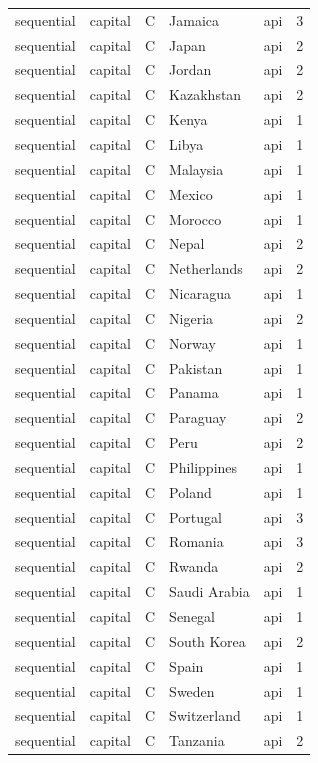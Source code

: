 \begin{tabular}{lllllr}
sequential & capital & C & Jamaica & api & 3 \\
sequential & capital & C & Japan & api & 2 \\
sequential & capital & C & Jordan & api & 2 \\
sequential & capital & C & Kazakhstan & api & 2 \\
sequential & capital & C & Kenya & api & 1 \\
sequential & capital & C & Libya & api & 1 \\
sequential & capital & C & Malaysia & api & 1 \\
sequential & capital & C & Mexico & api & 1 \\
sequential & capital & C & Morocco & api & 1 \\
sequential & capital & C & Nepal & api & 2 \\
sequential & capital & C & Netherlands & api & 2 \\
sequential & capital & C & Nicaragua & api & 1 \\
sequential & capital & C & Nigeria & api & 2 \\
sequential & capital & C & Norway & api & 1 \\
sequential & capital & C & Pakistan & api & 1 \\
sequential & capital & C & Panama & api & 1 \\
sequential & capital & C & Paraguay & api & 2 \\
sequential & capital & C & Peru & api & 2 \\
sequential & capital & C & Philippines & api & 1 \\
sequential & capital & C & Poland & api & 1 \\
sequential & capital & C & Portugal & api & 3 \\
sequential & capital & C & Romania & api & 3 \\
sequential & capital & C & Rwanda & api & 2 \\
sequential & capital & C & Saudi Arabia & api & 1 \\
sequential & capital & C & Senegal & api & 1 \\
sequential & capital & C & South Korea & api & 2 \\
sequential & capital & C & Spain & api & 1 \\
sequential & capital & C & Sweden & api & 1 \\
sequential & capital & C & Switzerland & api & 1 \\
sequential & capital & C & Tanzania & api & 2 \\

\end{tabular}
